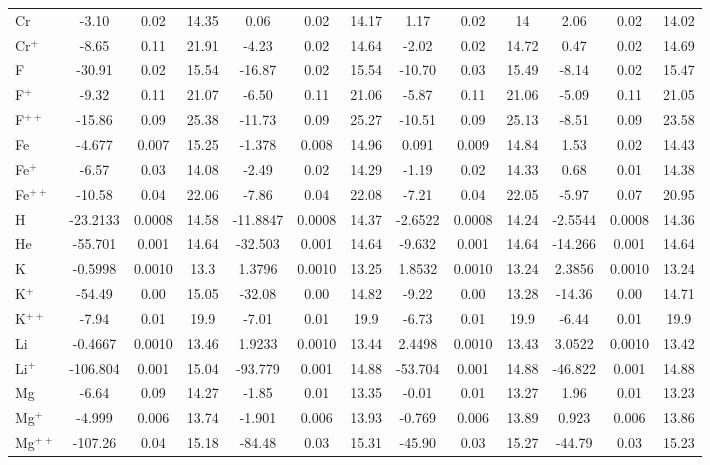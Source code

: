 \begin{longtable}{l!{\vrule width 0.25pt}ccc!{\vrule width 0.25pt}ccc!{\vrule width 0.25pt}ccc!{\vrule width 0.25pt}ccc}
Cr & -3.10 & 0.02 & 14.35 & 0.06 & 0.02 & 14.17 & 1.17 & 0.02 & 14 & 2.06 & 0.02 & 14.02 \\
Cr$^+$ & -8.65 & 0.11 & 21.91 & -4.23 & 0.02 & 14.64 & -2.02 & 0.02 & 14.72 & 0.47 & 0.02 & 14.69 \\
F & -30.91 & 0.02 & 15.54 & -16.87 & 0.02 & 15.54 & -10.70 & 0.03 & 15.49 & -8.14 & 0.02 & 15.47 \\
F$^+$ & -9.32 & 0.11 & 21.07 & -6.50 & 0.11 & 21.06 & -5.87 & 0.11 & 21.06 & -5.09 & 0.11 & 21.05 \\
F$^{++}$ & -15.86 & 0.09 & 25.38 & -11.73 & 0.09 & 25.27 & -10.51 & 0.09 & 25.13 & -8.51 & 0.09 & 23.58 \\
Fe & -4.677 & 0.007 & 15.25 & -1.378 & 0.008 & 14.96 & 0.091 & 0.009 & 14.84 & 1.53 & 0.02 & 14.43 \\
Fe$^+$ & -6.57 & 0.03 & 14.08 & -2.49 & 0.02 & 14.29 & -1.19 & 0.02 & 14.33 & 0.68 & 0.01 & 14.38 \\
Fe$^{++}$ & -10.58 & 0.04 & 22.06 & -7.86 & 0.04 & 22.08 & -7.21 & 0.04 & 22.05 & -5.97 & 0.07 & 20.95 \\
H & -23.2133 & 0.0008 & 14.58 & -11.8847 & 0.0008 & 14.37 & -2.6522 & 0.0008 & 14.24 & -2.5544 & 0.0008 & 14.36 \\
He & -55.701 & 0.001 & 14.64 & -32.503 & 0.001 & 14.64 & -9.632 & 0.001 & 14.64 & -14.266 & 0.001 & 14.64 \\
K & -0.5998 & 0.0010 & 13.3 & 1.3796 & 0.0010 & 13.25 & 1.8532 & 0.0010 & 13.24 & 2.3856 & 0.0010 & 13.24 \\
K$^+$ & -54.49 & 0.00 & 15.05 & -32.08 & 0.00 & 14.82 & -9.22 & 0.00 & 13.28 & -14.36 & 0.00 & 14.71 \\
K$^{++}$ & -7.94 & 0.01 & 19.9 & -7.01 & 0.01 & 19.9 & -6.73 & 0.01 & 19.9 & -6.44 & 0.01 & 19.9 \\
Li & -0.4667 & 0.0010 & 13.46 & 1.9233 & 0.0010 & 13.44 & 2.4498 & 0.0010 & 13.43 & 3.0522 & 0.0010 & 13.42 \\
Li$^+$ & -106.804 & 0.001 & 15.04 & -93.779 & 0.001 & 14.88 & -53.704 & 0.001 & 14.88 & -46.822 & 0.001 & 14.88 \\
Mg & -6.64 & 0.09 & 14.27 & -1.85 & 0.01 & 13.35 & -0.01 & 0.01 & 13.27 & 1.96 & 0.01 & 13.23 \\
Mg$^+$ & -4.999 & 0.006 & 13.74 & -1.901 & 0.006 & 13.93 & -0.769 & 0.006 & 13.89 & 0.923 & 0.006 & 13.86 \\
Mg$^{++}$ & -107.26 & 0.04 & 15.18 & -84.48 & 0.03 & 15.31 & -45.90 & 0.03 & 15.27 & -44.79 & 0.03 & 15.23 \\

\end{longtable}
